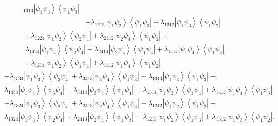 \documentclass[aps,preprint]{revtex4}%
\begin{document}
\begin{itemize}
\begin{align}
_{1313}\left\vert \psi_{1}\psi_{3}\right\rangle \left\langle \psi_{1}\psi
_{3}\right\vert \\
&  +\lambda_{1213}\left\vert \psi_{1}\psi_{2}\right\rangle \left\langle
\psi_{1}\psi_{3}\right\vert +\lambda_{1312}\left\vert \psi_{1}\psi
_{3}\right\rangle \left\langle \psi_{1}\psi_{2}\right\vert
\end{align}%
\begin{align}
&  +\lambda_{1224}\left\vert \psi_{1}\psi_{2}\right\rangle \left\langle
\psi_{2}\psi_{4}\right\vert +\lambda_{2412}\left\vert \psi_{2}\psi
_{4}\right\rangle \left\langle \psi_{1}\psi_{2}\right\vert +\\
&  \lambda_{1424}\left\vert \psi_{1}\psi_{4}\right\rangle \left\langle
\psi_{2}\psi_{4}\right\vert +\lambda_{2414}\left\vert \psi_{2}\psi
_{4}\right\rangle \left\langle \psi_{1}\psi_{4}\right\vert +\lambda
_{1414}\left\vert \psi_{1}\psi_{4}\right\rangle \left\langle \psi_{1}\psi
_{4}\right\vert \\
&  +\lambda_{1214}\left\vert \psi_{1}\psi_{2}\right\rangle \left\langle
\psi_{1}\psi_{4}\right\vert +\lambda_{1412}\left\vert \psi_{1}\psi
_{4}\right\rangle \left\langle \psi_{1}\psi_{2}\right\vert
\end{align}%
\begin{align}
&  +\lambda_{1334}\left\vert \psi_{1}\psi_{3}\right\rangle \left\langle
\psi_{3}\psi_{4}\right\vert +\lambda_{3413}\left\vert \psi_{3}\psi
_{4}\right\rangle \left\langle \psi_{1}\psi_{3}\right\vert +\lambda
_{1313}\left\vert \psi_{1}\psi_{3}\right\rangle \left\langle \psi_{1}\psi
_{3}\right\vert +\\
&  \lambda_{1434}\left\vert \psi_{1}\psi_{4}\right\rangle \left\langle
\psi_{3}\psi_{4}\right\vert +\lambda_{3414}\left\vert \psi_{3}\psi
_{4}\right\rangle \left\langle \psi_{1}\psi_{4}\right\vert +\lambda
_{1314}\left\vert \psi_{1}\psi_{3}\right\rangle \left\langle \psi_{1}\psi
_{4}\right\vert +\lambda_{1413}\left\vert \psi_{1}\psi_{4}\right\rangle
\left\langle \psi_{1}\psi_{3}\right\vert
\end{align}%
\begin{align}
&  +\lambda_{1324}\left\vert \psi_{1}\psi_{3}\right\rangle \left\langle
\psi_{2}\psi_{4}\right\vert +\lambda_{2413}\left\vert \psi_{2}\psi
_{4}\right\rangle \left\langle \psi_{1}\psi_{3}\right\vert +\lambda
_{1212}\left\vert \psi_{1}\psi_{2}\right\rangle \left\langle \psi_{1}\psi
_{2}\right\vert +\\
&  \lambda_{1324}\left\vert \psi_{1}\psi_{3}\right\rangle \left\langle
\psi_{2}\psi_{4}\right\vert +\lambda_{2413}\left\vert \psi_{2}\psi
_{4}\right\rangle \left\langle \psi_{1}\psi_{3}\right\vert +\lambda
_{1213}\left\vert \psi_{1}\psi_{2}\right\rangle \left\langle \psi_{1}\psi
_{3}\right\vert +\lambda_{1312}\left\vert \psi_{1}\psi_{3}\right\rangle
\left\langle \psi_{1}\psi_{2}\right\vert .
\end{align}



\end{itemize}
\end{document}
